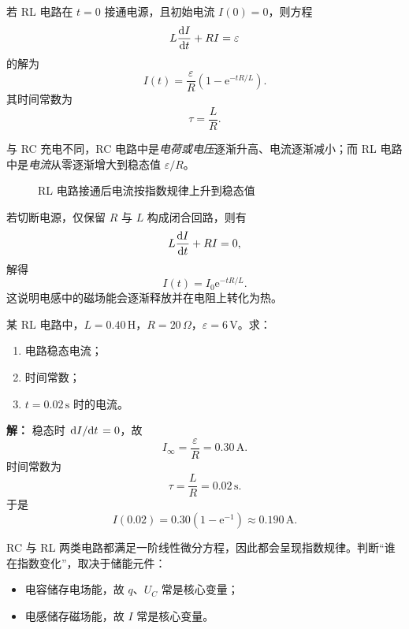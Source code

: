 \begin{theorem}
若 RL 电路在 $t=0$ 接通电源，且初始电流 $I(0)=0$，则方程
\[
L\dv{I}{t}+RI=\varepsilon
\]
的解为
\[
I(t)=\frac{\varepsilon}{R}\left(1-\mathrm{e}^{-tR/L}\right).
\]
其时间常数为
\[
\tau=\frac{L}{R}.
\]
\end{theorem}

与 RC 充电不同，RC 电路中是\emph{电荷或电压}逐渐升高、电流逐渐减小；而 RL 电路中是\emph{电流}从零逐渐增大到稳态值 $\varepsilon/R$。

\begin{figure}[htbp]
\centering
{}
\caption{RL 电路接通后电流按指数规律上升到稳态值}
\end{figure}

若切断电源，仅保留 $R$ 与 $L$ 构成闭合回路，则有
\[
L\dv{I}{t}+RI=0,
\]
解得
\[
I(t)=I_0\mathrm{e}^{-tR/L}.
\]
这说明电感中的磁场能会逐渐释放并在电阻上转化为热。

\begin{example}
某 RL 电路中，$L=0.40\,\text{H}$，$R=20\,\Omega$，$\varepsilon=6\,\text{V}$。求：
\begin{enumerate}
  \item 电路稳态电流；
  \item 时间常数；
  \item $t=0.02\,\text{s}$ 时的电流。
\end{enumerate}

\textbf{解：}
稳态时 $\dv*{I}{t}=0$，故
\[
I_{\infty}=\frac{\varepsilon}{R}=0.30\,\text{A}.
\]
时间常数为
\[
\tau=\frac{L}{R}=0.02\,\text{s}.
\]
于是
\[
I(0.02)=0.30\left(1-\mathrm{e}^{-1}\right)\approx 0.190\,\text{A}.
\]
\end{example}

\begin{remark}
RC 与 RL 两类电路都满足一阶线性微分方程，因此都会呈现指数规律。判断“谁在指数变化”，取决于储能元件：
\begin{itemize}
  \item 电容储存电场能，故 $q$、$U_C$ 常是核心变量；
  \item 电感储存磁场能，故 $I$ 常是核心变量。
\end{itemize}
\end{remark}

